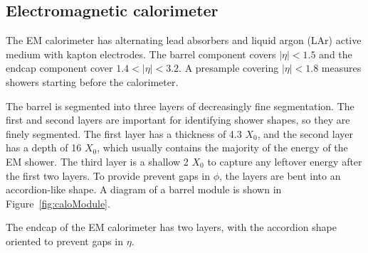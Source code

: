 \subsection{Electromagnetic calorimeter}
The EM calorimeter has alternating lead absorbers and liquid argon (LAr) active medium with kapton electrodes. The barrel component covers $|\eta| < 1.5$ and the endcap component cover $1.4 < |\eta| < 3.2$. A presample covering $|\eta| < 1.8$ measures showers starting before the calorimeter. 

The barrel is segmented into three layers of decreasingly fine segmentation. The first and second layers are important for identifying shower shapes, so they are finely segmented. The first layer has a thickness of 4.3 $X_0$, and the second layer has a depth of 16 $X_0$, which usually contains the majority of the energy of the EM shower. The third layer is a shallow 2 $X_0$ to capture any leftover energy after the first two layers. To provide prevent gaps in $\phi$, the layers are bent into an accordion-like shape. A diagram of a barrel module is shown in Figure~\ref{fig:caloModule}. 

The endcap of the EM calorimeter has two layers, with the accordion shape oriented to prevent gaps in $\eta$.




